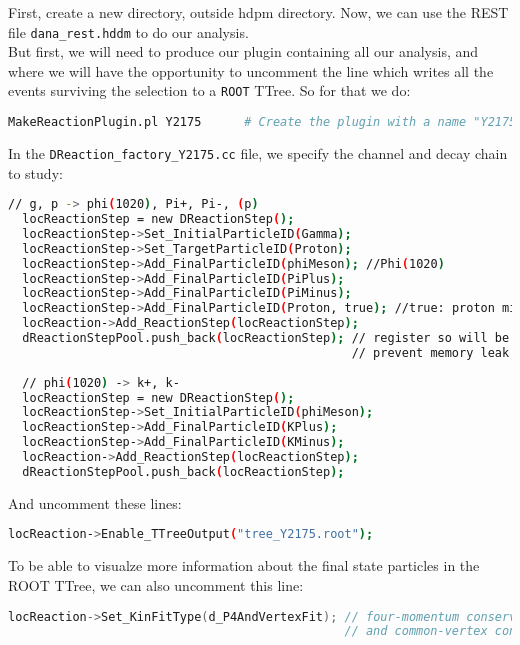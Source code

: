 \documentclass{article}
\begin{document}
First, create a new directory, outside hdpm directory.
\newline Now, we can use the REST file \texttt{dana\_rest.hddm} to do our analysis.\\
But first, we will need to produce our plugin containing all our analysis, and where we will have the opportunity to uncomment the line which writes all the events surviving the selection to a \texttt{ROOT} TTree.
So for that we do:

\begin{lstlisting}[language=bash]
  MakeReactionPlugin.pl Y2175      # Create the plugin with a name "Y2175"
\end{lstlisting}

In the \texttt{DReaction\_factory\_Y2175.cc} file, we specify the channel and decay chain to study:

\begin{lstlisting}[language=bash]
  // g, p -> phi(1020), Pi+, Pi-, (p)
  locReactionStep = new DReactionStep();
  locReactionStep->Set_InitialParticleID(Gamma);
  locReactionStep->Set_TargetParticleID(Proton);
  locReactionStep->Add_FinalParticleID(phiMeson); //Phi(1020)
  locReactionStep->Add_FinalParticleID(PiPlus);
  locReactionStep->Add_FinalParticleID(PiMinus);                                                                                                       
  locReactionStep->Add_FinalParticleID(Proton, true); //true: proton missing
  locReaction->Add_ReactionStep(locReactionStep);
  dReactionStepPool.push_back(locReactionStep); // register so will be deleted later
                                                // prevent memory leak
  
  // phi(1020) -> k+, k-
  locReactionStep = new DReactionStep();
  locReactionStep->Set_InitialParticleID(phiMeson);
  locReactionStep->Add_FinalParticleID(KPlus);
  locReactionStep->Add_FinalParticleID(KMinus);
  locReaction->Add_ReactionStep(locReactionStep);
  dReactionStepPool.push_back(locReactionStep);
\end{lstlisting}

And uncomment these lines:

\begin{lstlisting}[language=bash]
locReaction->Enable_TTreeOutput("tree_Y2175.root");
\end{lstlisting}
 
To be able to visualze more information about the final state particles in the ROOT TTree, we can also uncomment this line:

\begin{lstlisting}[language=c++]
locReaction->Set_KinFitType(d_P4AndVertexFit); // four-momentum conservation 
                                               // and common-vertex constraints
\end{lstlisting}
\end{document}
